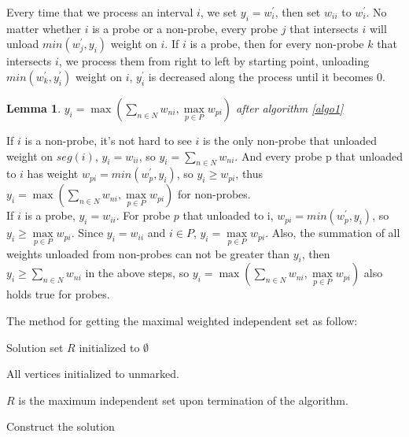 \documentclass[preprint,12pt,authoryear]{elsarticle}
\newtheorem{lemma}[theorem]{Lemma}
\newenvironment{proof}[1][Proof]{\begin{trivlist}
\item[\hskip \labelsep {\bfseries #1}]}{\end{trivlist}}
\begin{document}
Every time that we process an interval $i$, we set $y_i = w^{'}_i$, then set $w_{ii}$ to $w^{'}_i$. No matter whether $i$ is a probe or a non-probe, every probe $j$ that intersects $i$ will unload $min(w^{'}_j, y_i)$ weight on $i$. If $i$ is a probe, then for every non-probe $k$ that intersects $i$, we process them from right to left by starting point, unloading $min(w^{'}_k, y^{'}_i)$ weight on $i$, $y_{i}^{'}$ is decreased along the process until it becomes $0$.\\

\begin{lemma}
$y_i = \max(\sum\limits_{n\in N}w_{ni},\max\limits_{p\in P}w_{pi})$ after algorithm \ref{algo1}
\end{lemma}

\begin{proof}
If $i$ is a non-probe, it's not hard to see $i$ is the only non-probe that unloaded weight on $seg(i)$, $y_i = w_{ii}$, so $y_i = \sum\limits_{n\in N}w_{ni} $. And every probe p that unloaded to $i$ has weight $w_{pi} = min(w^{'}_p, y_i)$, so $y_i \geq w_{pi}$, thus $y_i = \max(\sum\limits_{n\in N}w_{ni},\max\limits_{p\in P}w_{pi})$ for non-probes.\\

If $i$ is a probe, $y_i = w_{ii}$. For probe $p$ that unloaded to i, $w_{pi} = min(w^{'}_p, y_i)$, so $y_i \geq \max\limits_{p\in P}w_{pi}$. Since $y_i = w_{ii}$ and $i \in P$, $y_i = \max\limits_{p\in P}w_{pi}$. Also, the summation of all weights unloaded from non-probes can not be greater than $y_i$, then $y_i \geq \sum\limits_{n\in N}w_{ni}$ in the above steps, so $y_i = \max(\sum\limits_{n\in N}w_{ni},\max\limits_{p\in P}w_{pi})$ also holds true for probes.\\
\end{proof}

The method for getting the maximal weighted independent set as follow:\\
\begin{algorithm}[ht]
\label{algo2}
\ShowLn

 Solution set $R$ initialized to $\emptyset$ \par
 All vertices initialized to unmarked.
 
$R$ is the maximum independent set upon termination of the algorithm.

\caption{Construct the solution}
\end{algorithm}
\end{document}
